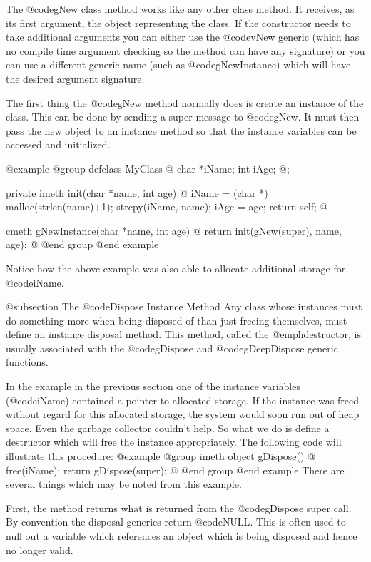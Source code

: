 The @code{gNew} class method works like any other class method.  It
receives, as its first argument, the object representing the class.
If the constructor needs to take additional arguments you can either
use the @code{vNew} generic (which has no compile time argument checking
so the method can have any signature) or you can use a different generic name
(such as @code{gNewInstance}) which will have the desired argument
signature.

The first thing the @code{gNew} method normally does is create an
instance of the class.  This can be done by sending a super message to
@code{gNew}.  It must then pass the new object to an instance method
so that the instance variables can be accessed and initialized.

@example
@group
defclass  MyClass  @{
        char    *iName;
        int     iAge;
@};

private imeth  init(char *name, int age)
@{
        iName = (char *) malloc(strlen(name)+1);
        strcpy(iName, name);
        iAge = age;
        return self;
@}

cmeth  gNewInstance(char *name, int age)
@{
        return init(gNew(super), name, age);
@}
@end group
@end example

Notice how the above example was also able to allocate additional storage
for @code{iName}.


@subsection The @code{Dispose} Instance Method
Any class whose instances must do something more when being disposed of
than just freeing themselves, must define an instance disposal method.
This method, called the @emph{destructor}, is usually associated with
the @code{gDispose} and @code{gDeepDispose} generic functions.

In the example in the previous section one of the instance variables
(@code{iName}) contained a pointer to allocated storage.  If the instance
was freed without regard for this allocated storage, the system would
soon run out of heap space.  Even the garbage collector couldn't help.
So what we do is define a destructor which will free the instance
appropriately.  The following code will illustrate this procedure:
@example
@group
imeth   object    gDispose()
@{
        free(iName);
        return gDispose(super);
@}
@end group
@end example
There are several things which may be noted from this example.

First, the method returns what is returned from the @code{gDispose}
super call.   By convention the disposal generics return @code{NULL}.
This is often used to null out a variable which references an object
which is being disposed and hence no longer valid.

